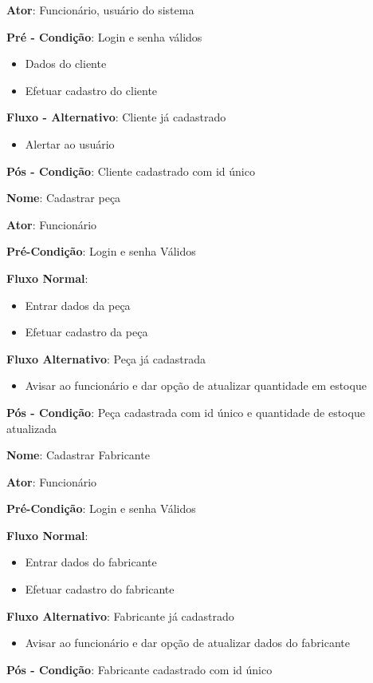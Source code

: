 \documentclass[a4paper,10pt]{article}
\begin{document}
\begin{framed}
\textbf{Ator}: Funcionário, usuário do sistema

\textbf{Pré - Condição}: Login e senha válidos
\begin{itemize}
\item Dados do cliente
\item Efetuar cadastro do cliente
\end{itemize}

\textbf{Fluxo - Alternativo}: Cliente já cadastrado
\begin{itemize}
\item Alertar ao usuário 
\end{itemize}
\textbf{Pós -  Condição}: Cliente cadastrado com id único
 
\end{framed}

\begin{framed}
\textbf{Nome}: Cadastrar peça

\textbf{Ator}: Funcionário

\textbf{Pré-Condição}: Login e senha Válidos

\textbf{Fluxo Normal}:

\begin{itemize}
\item Entrar dados da peça
\item Efetuar cadastro da peça
\end{itemize}
\textbf{Fluxo Alternativo}: Peça já cadastrada

\begin{itemize}
\item Avisar ao funcionário e dar opção de atualizar quantidade em estoque
\end{itemize}
\textbf{Pós -  Condição}: Peça cadastrada com id único e quantidade de estoque atualizada

\end{framed}

\begin{framed}
\textbf{Nome}: Cadastrar Fabricante

\textbf{Ator}: Funcionário

\textbf{Pré-Condição}: Login e senha Válidos

\textbf{Fluxo Normal}:
\begin{itemize}
\item Entrar dados do fabricante
\item Efetuar cadastro do fabricante
\end{itemize}
\textbf{Fluxo Alternativo}: Fabricante já cadastrado
\begin{itemize}
\item Avisar ao funcionário e dar opção de atualizar dados do fabricante
\end{itemize}
\textbf{Pós -  Condição}: Fabricante cadastrado com id único
\end{framed}
\end{document}
